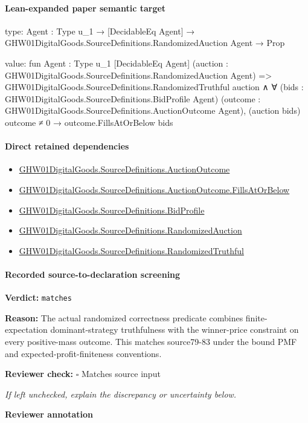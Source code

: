 \documentclass[10pt]{article}
\newcommand{\reviewerbox}{%
  \par\noindent\fbox{\parbox{0.96\linewidth}{\rule{0pt}{0.38in}}}\par
}
\newcommand{\reviewmatch}[1]{%
  \par\noindent\textbf{Reviewer check:} $\square$\; #1\par
  \noindent\emph{If left unchecked, explain the discrepancy or uncertainty below.}\par
}
\begin{document}
\paragraph{Lean-expanded paper semantic target}
\begin{ReviewVerbatim}
type:
{Agent : Type u_1} → [DecidableEq Agent] → GHW01DigitalGoods.SourceDefinitions.RandomizedAuction Agent → Prop

value:
fun {Agent : Type u_1} [DecidableEq Agent] (auction : GHW01DigitalGoods.SourceDefinitions.RandomizedAuction Agent) =>
  GHW01DigitalGoods.SourceDefinitions.RandomizedTruthful auction ∧
    ∀ (bids : GHW01DigitalGoods.SourceDefinitions.BidProfile Agent)
      (outcome : GHW01DigitalGoods.SourceDefinitions.AuctionOutcome Agent),
      (auction bids) outcome ≠ 0 → outcome.FillsAtOrBelow bids
\end{ReviewVerbatim}

\paragraph{Direct retained dependencies}
\begin{itemize}\raggedright
\item \hyperlink{paper-prerequisite-fc173e8d557afd08}{GHW01\allowbreak{}Digital\allowbreak{}Goods.\allowbreak{}Source\allowbreak{}Definitions.\allowbreak{}Auction\allowbreak{}Outcome}
\item \hyperlink{paper-prerequisite-babf36338c3fb190}{GHW01\allowbreak{}Digital\allowbreak{}Goods.\allowbreak{}Source\allowbreak{}Definitions.\allowbreak{}Auction\allowbreak{}Outcome.\allowbreak{}Fills\allowbreak{}At\allowbreak{}Or\allowbreak{}Below}
\item \hyperlink{paper-prerequisite-ac8769d0dccf04f4}{GHW01\allowbreak{}Digital\allowbreak{}Goods.\allowbreak{}Source\allowbreak{}Definitions.\allowbreak{}Bid\allowbreak{}Profile}
\item \hyperlink{paper-prerequisite-093498a5a1839250}{GHW01\allowbreak{}Digital\allowbreak{}Goods.\allowbreak{}Source\allowbreak{}Definitions.\allowbreak{}Randomized\allowbreak{}Auction}
\item \hyperlink{paper-prerequisite-24b555eb0370a69e}{GHW01\allowbreak{}Digital\allowbreak{}Goods.\allowbreak{}Source\allowbreak{}Definitions.\allowbreak{}Randomized\allowbreak{}Truthful}
\end{itemize}
\paragraph{Recorded source-to-declaration screening}
\textbf{Verdict:} \texttt{matches}
\\
{\raggedright
\textbf{Reason:} The actual randomized correctness predicate combines finite-\allowbreak{}expectation dominant-\allowbreak{}strategy truthfulness with the winner-\allowbreak{}price constraint on every positive-\allowbreak{}mass outcome.\allowbreak{} This matches source79-\allowbreak{}83 under the bound PMF and expected-\allowbreak{}profit-\allowbreak{}finiteness conventions.\allowbreak{}
\par}
\reviewmatch{Matches source input}
\noindent\textbf{Reviewer annotation}\par
\reviewerbox
\clearpage
\hypertarget{paper-prerequisite-7dae05fb89eafa92}{}
\end{document}

